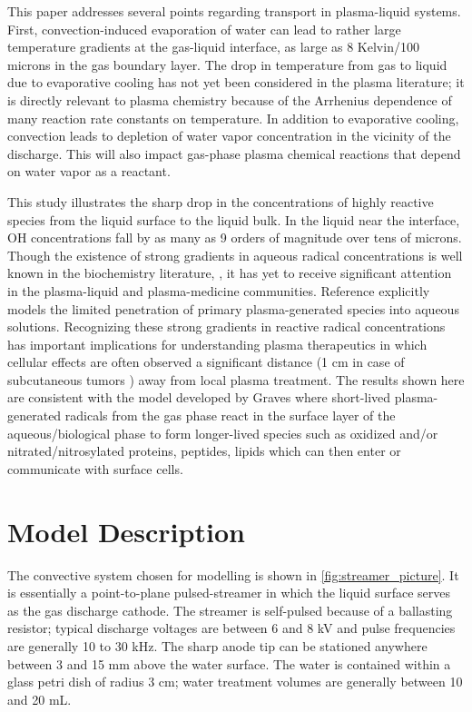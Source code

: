 \documentclass[12pt]{article}
\begin{document}
This paper addresses several points regarding transport in plasma-liquid systems. First, convection-induced evaporation of water can lead to rather large temperature gradients at the gas-liquid interface, as large as 8 Kelvin/100 microns in the gas boundary layer. The drop in temperature from gas to liquid due to evaporative cooling has not yet been considered in the plasma literature; it is directly relevant to plasma chemistry because of the Arrhenius dependence of many reaction rate constants on temperature. In addition to evaporative cooling, convection leads to depletion of water vapor concentration in the vicinity of the discharge. This will also impact gas-phase plasma chemical reactions that depend on water vapor as a reactant. \cite{winter2013feed}

This study illustrates the sharp drop in the concentrations of highly reactive species from the liquid surface to the liquid bulk. In the liquid near the interface, OH concentrations fall by as many as 9 orders of magnitude over tens of microns. Though the existence of strong gradients in aqueous radical concentrations is well known in the biochemistry literature, \cite{Bachi2013,Halliwell}, it has yet to receive significant attention in the plasma-liquid and plasma-medicine communities. Reference \cite{Chen2014a} explicitly models the limited penetration of primary plasma-generated species into aqueous solutions. Recognizing these strong gradients in reactive radical concentrations has important implications for understanding plasma therapeutics in which cellular effects are often observed a significant distance (1 cm in case of subcutaneous tumors \cite{Graves2014review}) away from local plasma treatment. The results shown here are consistent with the model developed by Graves \cite{Graves2014review} where short-lived plasma-generated radicals from the gas phase react in the surface layer of the aqueous/biological phase to form longer-lived species such as oxidized and/or nitrated/nitrosylated proteins, peptides, lipids which can then enter or communicate with surface cells.      

\section{Model Description}

The convective system chosen for modelling is shown in \cref{fig:streamer_picture}. It is essentially a point-to-plane pulsed-streamer in which the liquid surface serves as the gas discharge cathode. The streamer is self-pulsed because of a ballasting resistor; typical discharge voltages are between 6 and 8 kV and pulse frequencies are generally 10 to 30 kHz. The sharp anode tip can be stationed anywhere between 3 and 15 mm above the water surface. The water is contained within a glass petri dish of radius 3 cm; water treatment volumes are generally between 10 and 20 mL.  
\end{document}
